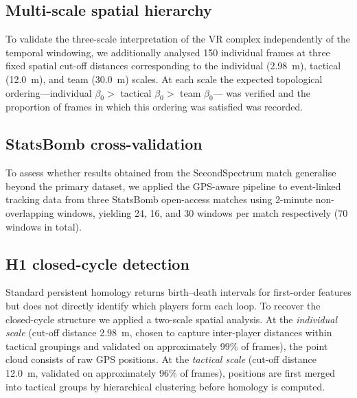 \documentclass[11pt,a4paper]{article}
\begin{document}
\subsection{Multi-scale spatial hierarchy}
\label{sec:hierarchy}

To validate the three-scale interpretation of the VR complex
independently of the temporal windowing, we additionally
analysed 150 individual frames at three fixed spatial
cut-off distances corresponding to the individual
(2.98~m), tactical (12.0~m), and team (30.0~m) scales.
At each scale the expected topological ordering---individual
\(\beta_0 >\) tactical \(\beta_0 >\) team \(\beta_0\)---
was verified and the proportion of frames in which this
ordering was satisfied was recorded.

\subsection{StatsBomb cross-validation}
\label{sec:statsbomb}

To assess whether results obtained from the SecondSpectrum
match generalise beyond the primary dataset, we applied
the GPS-aware pipeline to event-linked tracking data from
three StatsBomb open-access matches
\citep[match IDs 3879600, 3901250, and 3754300]{Gudmundsson2017}
using 2-minute non-overlapping windows, yielding 24, 16, and
30 windows per match respectively (70 windows in total).

\subsection{H1 closed-cycle detection}
\label{sec:h1cycles}

Standard persistent homology returns birth--death intervals
for first-order features but does not directly identify
which players form each loop.  To recover the closed-cycle
structure we applied a two-scale spatial analysis.  At the
\emph{individual scale} (cut-off distance 2.98~m, chosen to
capture inter-player distances within tactical groupings and
validated on approximately 99\% of frames), the point cloud
consists of raw GPS positions.  At the \emph{tactical scale}
(cut-off distance 12.0~m, validated on approximately 96\%
of frames), positions are first merged into tactical groups
by hierarchical clustering before homology is computed.
\end{document}
